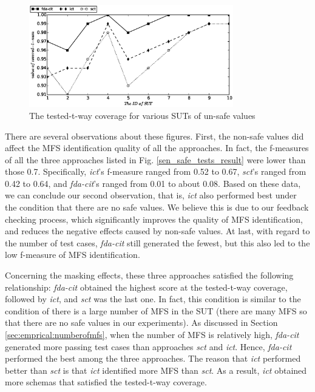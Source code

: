 \documentclass[journal,12pt,onecolumn,draftclsnofoot,]{IEEEtran}
\begin{document}
\begin{figure}[htbp]
 \includegraphics[width=3.5in]{sen_safe_t_tuple.eps}
\caption{The tested-t-way coverage for various SUTs of un-safe values}
\label{sen_safe_t_tuple_result}
\end{figure}

There are several observations about these figures. First, the non-safe values did affect the MFS identification quality of all the approaches. In fact, the f-measures of all the three approaches listed in Fig. \ref{sen_safe_tests_result} were lower than those 0.7. Specifically, \emph{ict}'s f-measure ranged from 0.52 to 0.67,  \emph{sct}'s ranged from  0.42 to 0.64, and \emph{fda-cit}'s ranged from 0.01 to about 0.08. Based on these data, we can conclude our second observation, that is, \emph{ict} also performed best under the condition that there are no safe values. We believe this is due to our feedback checking process, which significantly improves the quality of MFS identification, and reduces the negative effects caused by non-safe values. At last, with regard to the number of test cases, \emph{fda-cit} still generated the fewest, but this also led to the low f-measure of MFS identification.

Concerning the masking effects, these three approaches satisfied the following relationship: \emph{fda-cit} obtained the highest score at the tested-t-way coverage, followed by \emph{ict}, and \emph{sct} was the last one. In fact, this condition is similar to the condition of there is a large number of MFS in the SUT (there are many MFS so that there are no safe values in our experiments).  As discussed in Section \ref{sec:emprical:numberofmfs}, when the number of MFS is relatively high, \emph{fda-cit} generated more passing test cases than approaches \emph{sct} and \emph{ict}. Hence, \emph{fda-cit} performed the best among the three approaches. The reason that \emph{ict} performed better than \emph{sct} is that \emph{ict} identified more MFS than \emph{sct}. As a result, \emph{ict} obtained more schemas that satisfied the tested-t-way coverage.
\end{document}
